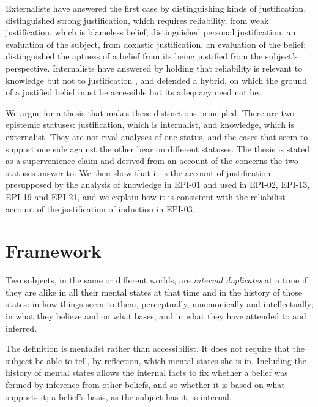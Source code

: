 \documentclass{situationist-preprint}
\begin{document}
Externalists have answered the first case by distinguishing kinds of justification. \citet{Goldman1988} distinguished strong justification, which requires reliability, from weak justification, which is blameless belief; \citet{Engel1992} distinguished personal justification, an evaluation of the subject, from doxastic justification, an evaluation of the belief; \citet{Sosa1991} distinguished the aptness of a belief from its being justified from the subject's perspective. Internalists have answered by holding that reliability is relevant to knowledge but not to justification \citep{ConeeFeldman2004}, and \citet{Alston1988} defended a hybrid, on which the ground of a justified belief must be accessible but its adequacy need not be.

We argue for a thesis that makes these distinctions principled. There are two epistemic statuses: justification, which is internalist, and knowledge, which is externalist. They are not rival analyses of one status, and the cases that seem to support one side against the other bear on different statuses. The thesis is stated as a supervenience claim and derived from an account of the concerns the two statuses answer to. We then show that it is the account of justification presupposed by the analysis of knowledge in EPI-01 and used in EPI-02, EPI-13, EPI-19 and EPI-21, and we explain how it is consistent with the reliabilist account of the justification of induction in EPI-03.

\section{Framework}

\begin{definition}\label{d:dup}
Two subjects, in the same or different worlds, are \emph{internal duplicates} at a time if they are alike in all their mental states at that time and in the history of those states: in how things seem to them, perceptually, mnemonically and intellectually; in what they believe and on what bases; and in what they have attended to and inferred.
\end{definition}

The definition is mentalist rather than accessibilist. It does not require that the subject be able to tell, by reflection, which mental states she is in. Including the history of mental states allows the internal facts to fix whether a belief was formed by inference from other beliefs, and so whether it is based on what supports it; a belief's basis, as the subject has it, is internal.
\end{document}
